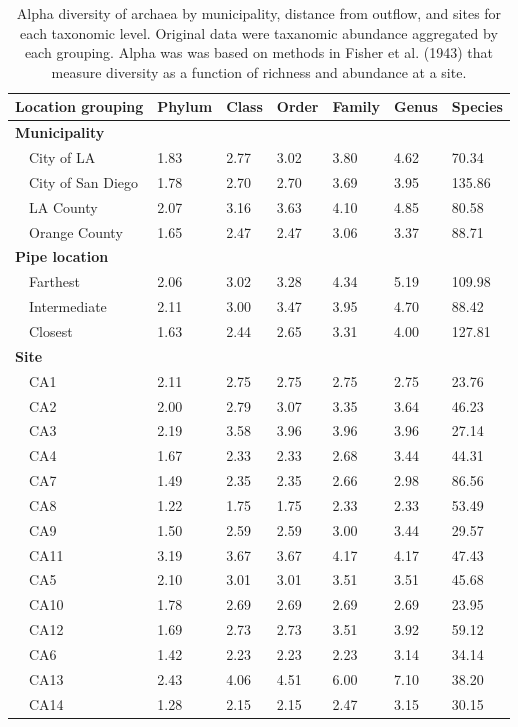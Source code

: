 \documentclass[letterpaper,12pt]{article}\usepackage[]{graphicx}\usepackage[]{color}
\begin{document}
\begin{table}[!tbp]
\caption{Alpha diversity of archaea by municipality, distance from outflow, and sites for each taxonomic level.  Original data were taxanomic abundance aggregated by each grouping.  Alpha was was based on methods in Fisher et al. (1943) that measure diversity as a function of richness and abundance at a site.\label{tab:alpha_arch}} 
\begin{center}
\begin{tabular}{lllllll}
\hline\hline
\multicolumn{1}{l}{Location grouping}&\multicolumn{1}{c}{Phylum}&\multicolumn{1}{c}{Class}&\multicolumn{1}{c}{Order}&\multicolumn{1}{c}{Family}&\multicolumn{1}{c}{Genus}&\multicolumn{1}{c}{Species}\tabularnewline
\hline
{\bfseries Municipality}&&&&&&\tabularnewline
~~City of LA&1.83&2.77&3.02&3.80&4.62& 70.34\tabularnewline
~~City of San Diego&1.78&2.70&2.70&3.69&3.95&135.86\tabularnewline
~~LA County&2.07&3.16&3.63&4.10&4.85& 80.58\tabularnewline
~~Orange County&1.65&2.47&2.47&3.06&3.37& 88.71\tabularnewline
\hline
{\bfseries Pipe location}&&&&&&\tabularnewline
~~Farthest&2.06&3.02&3.28&4.34&5.19&109.98\tabularnewline
~~Intermediate&2.11&3.00&3.47&3.95&4.70& 88.42\tabularnewline
~~Closest&1.63&2.44&2.65&3.31&4.00&127.81\tabularnewline
\hline
{\bfseries Site}&&&&&&\tabularnewline
~~CA1&2.11&2.75&2.75&2.75&2.75& 23.76\tabularnewline
~~CA2&2.00&2.79&3.07&3.35&3.64& 46.23\tabularnewline
~~CA3&2.19&3.58&3.96&3.96&3.96& 27.14\tabularnewline
~~CA4&1.67&2.33&2.33&2.68&3.44& 44.31\tabularnewline
~~CA7&1.49&2.35&2.35&2.66&2.98& 86.56\tabularnewline
~~CA8&1.22&1.75&1.75&2.33&2.33& 53.49\tabularnewline
~~CA9&1.50&2.59&2.59&3.00&3.44& 29.57\tabularnewline
~~CA11&3.19&3.67&3.67&4.17&4.17& 47.43\tabularnewline
~~CA5&2.10&3.01&3.01&3.51&3.51& 45.68\tabularnewline
~~CA10&1.78&2.69&2.69&2.69&2.69& 23.95\tabularnewline
~~CA12&1.69&2.73&2.73&3.51&3.92& 59.12\tabularnewline
~~CA6&1.42&2.23&2.23&2.23&3.14& 34.14\tabularnewline
~~CA13&2.43&4.06&4.51&6.00&7.10& 38.20\tabularnewline
~~CA14&1.28&2.15&2.15&2.47&3.15& 30.15\tabularnewline
\hline
\end{tabular}\end{center}
\end{table}
\end{document}
